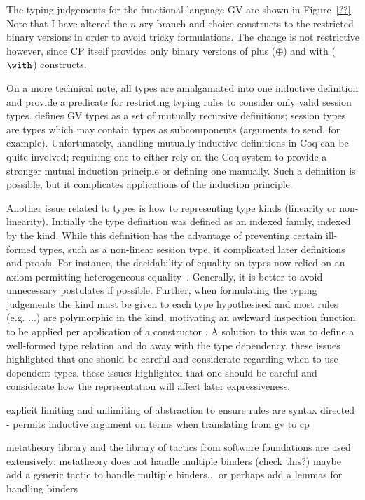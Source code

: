 

The typing judgements for the functional language GV are shown in
Figure~\ref{??}. Note that I have altered the $n$-ary branch and choice
constructs to the restricted binary versions in order to avoid tricky
formulations. The change is not restrictive however, since CP itself provides
only binary versions of plus ($\oplus$) and with ($\with$) constructs.

On a more technical note, all types are amalgamated into one inductive
definition and provide a predicate for restricting typing rules to consider
only valid session types. \citeauthor{Wadler:2014} defines GV types as a set
of mutually recursive definitions; session types are types which may contain
types as subcomponents (arguments to send, for example). Unfortunately,
handling mutually inductive definitions in Coq can be quite involved;
requiring one to either rely on the Coq system to provide a stronger mutual
induction principle or defining one manually. Such a definition is possible,
but it complicates applications of the induction principle.

Another issue related to types is how to representing type kinds (linearity or
non-linearity). Initially the type definition was defined as an indexed
family, indexed by the kind. While this definition has the advantage of
preventing certain ill-formed types, such as a non-linear session type, it
complicated later definitions and proofs. For instance, the decidability of
equality on types now relied on an axiom permitting heterogeneous
equality~\cite{??}. Generally, it is better to avoid unnecessary postulates if
possible. Further, when formulating the typing judgements the kind must be
given to each type hypothesised and most rules (e.g. ...) are polymorphic in
the kind, motivating an awkward inspection function to be applied per
application of a constructor . A solution to
this was to define a well-formed type relation and do away with the type
dependency. these issues highlighted that one should be careful and
considerate regarding when to use dependent types. these issues highlighted
that one should be careful and considerate how the representation will affect
later expressiveness.

explicit limiting and unlimiting of abstraction to ensure rules are syntax
directed - permits inductive argument on terms when translating from gv to cp

metatheory library and the library of tactics from software foundations are
used extensively: metatheory does not handle multiple binders (check this?)
maybe add a generic tactic to handle multiple binders... or perhaps add a
lemmas for handling binders

